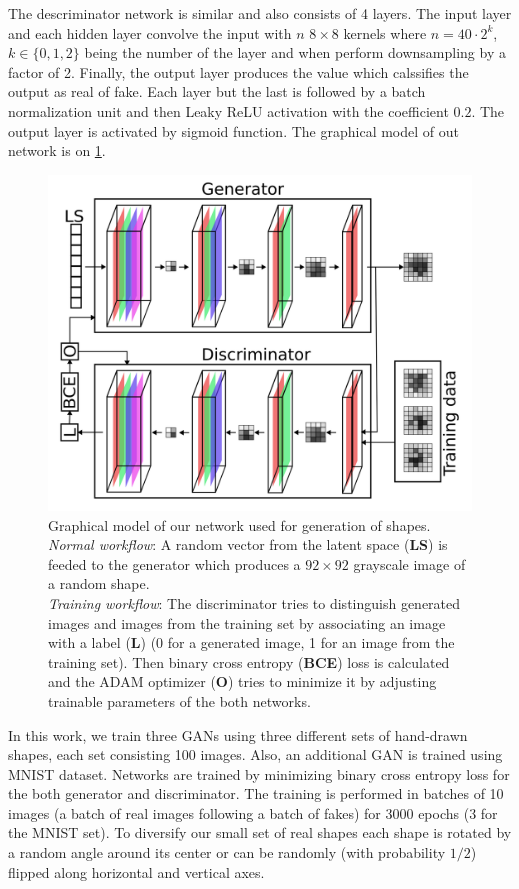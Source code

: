\documentclass[reprint,amsmath,amssymb,aps,pre,showkeys,showpacs]{revtex4-1}
\begin{document}
The descriminator network is similar and also consists of 4 layers. The input
layer and each hidden layer convolve the input with $n$ $8 \times 8$ kernels
where $n = 40 \cdot 2^{k}$, $k \in \{0, 1, 2\}$ being the number of the layer
and when perform downsampling by a factor of 2. Finally, the output layer
produces the value which calssifies the output as real of fake. Each layer but
the last is followed by a batch normalization unit and then Leaky ReLU
activation with the coefficient $0.2$. The output layer is activated by sigmoid
function. The graphical model of out network is on \cref{fig:network}.
\begin{figure}[tp]
  \centering
  \includegraphics[width=0.6\linewidth]{images/network.png}
  \caption[]{Graphical model of our network used for generation of
    shapes. \\ \textit{Normal workflow}: A random vector from the latent space
    (\textbf{LS}) is feeded to the generator which produces a $92 \times 92$
    grayscale image of a random shape. \\ \textit{Training workflow}: The
    discriminator tries to distinguish generated images and images from the
    training set by associating an image with a label (\textbf{L}) (0 for a
    generated image, 1 for an image from the training set). Then binary cross
    entropy (\textbf{BCE}) loss is calculated and the ADAM optimizer
    (\textbf{O}) tries to minimize it by adjusting trainable parameters of the
    both networks.}
  \label{fig:network}
\end{figure}

In this work, we train three GANs using three different sets of hand-drawn
shapes, each set consisting 100 images. Also, an additional GAN is trained using
MNIST dataset\cite{deng2012mnist}. Networks are trained by minimizing binary
cross entropy loss for the both generator and discriminator. The training is
performed in batches of 10 images (a batch of real images following a batch of
fakes) for 3000 epochs (3 for the MNIST set). To diversify our small set of real
shapes each shape is rotated by a random angle around its center or can be
randomly (with probability $1/2$) flipped along horizontal and vertical axes.
\end{document}
